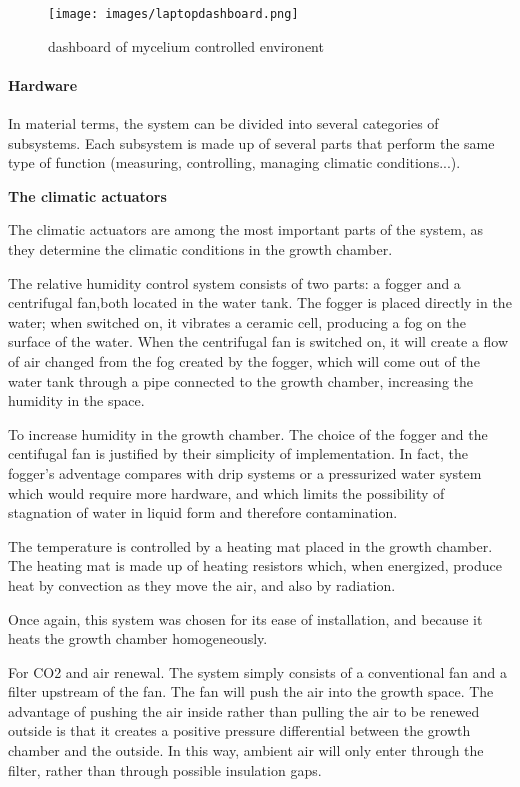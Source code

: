 \begin{figure}[h]
    \centering
    \texttt{[image: images/laptopdashboard.png]}
    \caption{dashboard of mycelium controlled environent}
    \label{fig:Mycemachinne}
\end{figure} 

\paragraph{Hardware}

In material terms, the system can be divided into several categories of subsystems. 
Each subsystem is made up of several parts that perform the same type of function (measuring, controlling, managing climatic conditions...). 

\textbf{The climatic actuators} 

The climatic actuators are among the most important parts of the system, as they determine the climatic conditions in the growth chamber. 

The relative humidity control system consists of two parts: a fogger and a centrifugal fan,both located in the water tank. 
The fogger is placed directly in the water; when switched on, it vibrates a ceramic cell, producing a fog on the surface of the water. 
When the centrifugal fan is switched on, it will create a flow of air changed from the fog created by the fogger, which will come out of the water tank through a pipe connected to the growth chamber, increasing the humidity in the space. 

To increase humidity in the growth chamber. The choice of the fogger and the centifugal fan is justified by their simplicity of implementation. In fact, the fogger's adventage compares with drip systems or a pressurized water system which would require more hardware, and which limits the possibility of stagnation of water in liquid form and therefore contamination. 

The temperature is controlled by a heating mat placed in the growth chamber. The heating mat is made up of heating resistors which, when energized, produce heat by convection as they move the air, and also by radiation. 

Once again, this system was chosen for its ease of installation, and because it heats the growth chamber homogeneously. 

For CO2 and air renewal. The system simply consists of a conventional fan and a filter upstream of the fan.  The fan will push the air into the growth space. The advantage of pushing the air inside rather than pulling the air to be renewed outside is that it creates a positive pressure differential between the growth chamber and the outside. In this way, ambient air will only enter through the filter, rather than through possible insulation gaps. 

